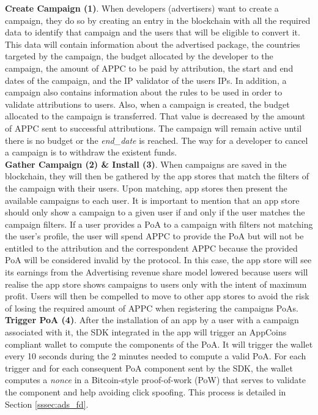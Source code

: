 \noindent \textbf{Create Campaign (1)}. When developers (advertisers) want to create a campaign, they do so by creating an entry in the blockchain with all the required data to identify that campaign and the users that will be eligible to convert it. This data will contain information about the advertised package, the countries targeted by the campaign, the budget allocated by the developer to the campaign, the amount of \textsf{APPC} to be paid by attribution, the start and end dates of the campaign, and the IP validator of the users IPs. In addition, a campaign also contains information about the rules to be used in order to validate attributions to users. Also, when a campaign is created, the budget allocated to the campaign is transferred. That value is decreased by the amount of \textsf{APPC} sent to successful attributions. The campaign will remain active until there is no budget or the {\em end\_date} is reached. The way for a developer to cancel a campaign is to withdraw the existent funds. \\

\noindent \textbf{Gather Campaign (2) \& Install (3)}. When campaigns are saved in the blockchain, they will then be gathered by the app stores that match the filters of the campaign with their users. Upon matching, app stores then present the available campaigns to each user. It is important to mention that an app store should only show a campaign to a given user if and only if the user matches the campaign filters. If a user provides a \textsf{PoA} to a campaign with filters not matching the user's profile, the user will spend \textsf{APPC} to provide the \textsf{PoA} but will not be entitled to the attribution and the correspondent \textsf{APPC} because the provided \textsf{PoA} will be considered invalid by the protocol. In this case, the app store will see its earnings from the Advertising revenue share model lowered because users will realise the app store shows campaigns to users only with the intent of maximum profit. Users will then be compelled to move to other app stores to avoid the risk of losing the required amount of \textsf{APPC} when registering the campaigns \textsf{PoAs}.\\

\noindent \textbf{Trigger \textsf{PoA} (4)}. After the installation of an app by a user with a campaign associated with it, the SDK integrated in the app will trigger an AppCoins compliant wallet to compute the components of the \textsf{PoA}. It will trigger the wallet every 10 seconds during the 2 minutes needed to compute a valid \textsf{PoA}. For each trigger and for each consequent \textsf{PoA} component sent by the SDK, the wallet computes a \textit{nonce} in a Bitcoin-style proof-of-work (PoW) that serves to validate the component and help avoiding click spoofing. This process is detailed in Section \ref{sssec:ads_fd}. \\


